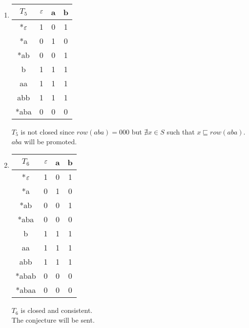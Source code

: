 \begin{enumerate}
  \item \begin{minipage}{0.3\textwidth}
          \begin{tabular}{c||c |c|c}
            $T_5$ & $\varepsilon$ & a & b \\
            \hline\hline
            *$\varepsilon$ & 1    & 0 & 1 \\
            *a    & 0    & 1 & 0 \\
            *ab   & 0    & 0 & 1 \\
            \hline\hline
            b     & 1    & 1 & 1 \\
            aa    & 1    & 1 & 1 \\
            abb   & 1    & 1 & 1 \\
            *aba  & 0    & 0 & 0 \\
          \end{tabular}
        \end{minipage}\quad
        \begin{minipage}{0.6\textwidth}
          $T_5$ is not closed since $row(aba) = 000$ but $\nexists x \in S$ such that $x \sqsubseteq row(aba)$.\\
          $aba$ will be promoted.
        \end{minipage}

  \item \begin{minipage}{0.3\textwidth}
          \begin{tabular}{c||c |c|c}
            $T_6$ & $\varepsilon$ & a & b \\
            \hline\hline
            *$\varepsilon$ & 1    & 0 & 1 \\
            *a    & 0    & 1 & 0 \\
            *ab   & 0    & 0 & 1 \\
            *aba  & 0    & 0 & 0 \\
            \hline\hline
            b     & 1    & 1 & 1 \\
            aa    & 1    & 1 & 1 \\
            abb   & 1    & 1 & 1 \\
            *abab & 0    & 0 & 0 \\
            *abaa & 0    & 0 & 0 \\
          \end{tabular}
        \end{minipage}\quad
        \begin{minipage}{0.6\textwidth}
          $T_6$ is closed and consistent.\\
          The conjecture will be sent.
        \end{minipage}


\end{enumerate}
